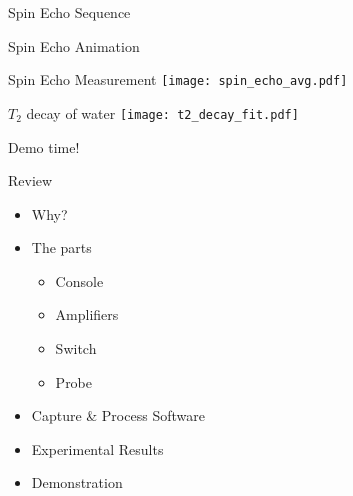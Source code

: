 \documentclass{ethpresentation}
\begin{document}
\begin{frame}{Spin Echo Sequence}
  \centering
  
\end{frame}

\begin{frame}{Spin Echo Animation}
  \begin{center}
  \end{center}
\end{frame}

\begin{frame}{Spin Echo Measurement}
  \centering
  \texttt{[image: spin\_echo\_avg.pdf]}
\end{frame}


\begin{frame}{\(T_2\) decay of water}
  \centering
  \texttt{[image: t2\_decay\_fit.pdf]}
\end{frame}

\begin{frame}[standout]
  Demo time!
\end{frame}

\begin{frame}{Review}
  \begin{itemize}
    \item Why?
    \item The parts%
          \begin{itemize}
            \item Console
            \item Amplifiers
            \item Switch
            \item Probe
          \end{itemize}
    \item Capture \& Process Software
    \item Experimental Results
    \item Demonstration
  \end{itemize}
\end{frame}
\end{document}
